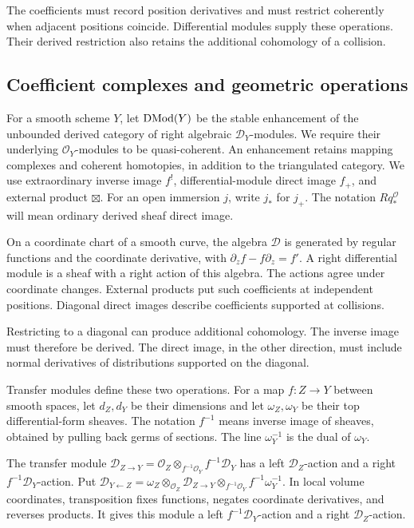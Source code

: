 The coefficients must record position derivatives and must restrict
coherently when adjacent positions coincide. Differential modules supply
these operations. Their derived restriction also retains the additional
cohomology of a collision.

\subsection{Coefficient complexes and geometric operations}

For\label{ogd:def:right-differential-module-conventions} a smooth scheme \(Y\), let \(\operatorname{DMod}(Y)\) be the stable enhancement of the unbounded derived category of right algebraic \(\mathcal D_Y\)-modules.
We require their underlying \(\mathcal O_Y\)-modules to be quasi-coherent.
An enhancement retains mapping complexes and coherent homotopies, in addition to the triangulated category.
We use extraordinary inverse image \(f^!\), differential-module direct image \(f_+\), and external product \(\boxtimes\).
For an open immersion \(j\), write \(j_*\) for \(j_+\).
The notation \(Rq_*^{\mathcal O}\) will mean ordinary derived sheaf direct image.

On\label{oco:def:differential-operator-sheaf} a coordinate chart of a smooth curve, the algebra \(\mathcal D\)
is generated by regular functions and the coordinate derivative, with
\(\partial_z f-f\partial_z=f'\).
A right differential module is a sheaf with a right action of this algebra.
The actions agree under coordinate changes.
External\label{ogd:def:external-coefficient-product} products put such coefficients at independent positions.
Diagonal direct images describe coefficients supported at collisions.

Restricting to a diagonal can produce additional cohomology.
The inverse image must therefore be derived.
The direct image, in the other direction, must include normal
derivatives of distributions supported on the diagonal.

Transfer\label{ogd:def:transfer-dimensions-and-form-lines} modules define these two operations. For a map
$f:Z\to Y$ between smooth spaces, let $d_Z,d_Y$ be their dimensions
and let $\omega_Z,\omega_Y$ be their top differential-form sheaves.
The notation $f^{-1}$ means inverse image of sheaves, obtained by
pulling back germs of sections. The line $\omega_Y^{-1}$ is the
dual of $\omega_Y$.

The\label{ogd:def:right-transfer-bimodule} transfer module
$\mathcal D_{Z\to Y}=\mathcal O_Z\otimes_{f^{-1}\mathcal O_Y}
 f^{-1}\mathcal D_Y$ has a left $\mathcal D_Z$-action
and a right $f^{-1}\mathcal D_Y$-action. Put
$\mathcal D_{Y\leftarrow Z}
=\omega_Z\otimes_{\mathcal O_Z}\mathcal D_{Z\to Y}
 \otimes_{f^{-1}\mathcal O_Y}f^{-1}\omega_Y^{-1}$.
In local volume coordinates, transposition fixes functions, negates
coordinate derivatives, and reverses products.
It gives this module a left $f^{-1}\mathcal D_Y$-action and
a right $\mathcal D_Z$-action.

